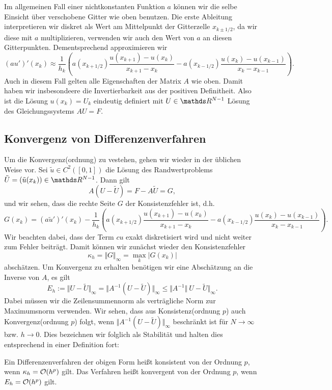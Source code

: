 Im allgemeinen Fall einer nichtkonstanten Funktion $a$ k\"onnen wir die selbe Einsicht \"uber verschobene Gitter wie oben benutzen. Die erste Ableitung interpretieren wir diskret als Wert am Mittelpunkt der Gitterzelle $x_{k\pm1/2}$, da wir diese mit $a$ multiplizieren, verwenden wir auch den Wert von $a$ an diesen Gitterpunkten. Dementsprechend approximieren wir
$$ (a u')'(x_k) \approx \frac{1}{h_k} \left( a(x_{k+1/2}) \frac{u(x_{k+1}) -  u(x_k)}{x_{k+1}-x_k} - a(x_{k-1/2}) \frac{u(x_k)- u(x_{k-1})}{x_k - x_{k-1}} \right). $$
Auch in diesem Fall gelten alle Eigenschaften der Matrix $A$ wie oben. Damit haben wir insbesondeere die Invertierbarkeit aus der positiven Definitheit. Also ist die L\"osung $u(x_k) =U_k$ eindeutig definiert mit $U \in \R^{N-1}$ L\"osung des Gleichungssystems $AU=F$.

\subsection{Konvergenz von Differenzenverfahren} 

Um die Konvergenz(ordnung) zu vestehen, gehen wir wieder in der \"ublichen Weise vor. Sei $\tilde u \in C^2([0,1])$ die L\"osung des Randwertproblems $\tilde U = (\tilde u(x_k)) \in \R^{N-1}$. Dann gilt 
$$ A (U - \tilde U) = F - A \tilde U = G, $$
und wir sehen, dass die rechte Seite $G$ der Konsistenzfehler ist, d.h.
$$ G(x_k) = (a \tilde u')'(x_k) - \frac{1}{h_k} \left( a(x_{k+1/2}) \frac{u(x_{k+1}) -  u(x_k)}{x_{k+1}-x_k} - a(x_{k-1/2}) \frac{u(x_k)- u(x_{k-1})}{x_k - x_{k-1}} \right). $$
Wir beachten dabei, dass der Term $cu$ exakt diskretisiert wird und nicht weiter zum Fehler beitr\"agt. Damit k\"onnen wir zun\"achst wieder den Konsistenzfehler 
\begin{equation}
\kappa_h = \Vert G\Vert_\infty =  \max_{k} \vert G(x_k) \vert
\end{equation}
absch\"atzen. Um Konvergenz zu erhalten ben\"otigen wir eine Absch\"atzung an  die Inverse von $A$, es gilt
$$ E_h := \Vert U - \tilde U\Vert_\infty = \Vert A^{-1} (U - \tilde U) \Vert_\infty \leq \Vert A^{-1}  \Vert ~ U - \tilde U \Vert_\infty. $$
Dabei m\"ussen wir die Zeilensummennorm als vertr\"agliche Norm zur Maximumsnorm verwenden. Wir sehen, dass aus Konsistenz(ordnung $p$) auch Konvergenz(ordnung $p$) folgt, wenn $\Vert A^{-1} (U - \tilde U) \Vert_\infty$ beschr\"ankt ist f\"ur $N\rightarrow \infty$ bzw. $h \rightarrow 0$. Dies bezeichnen wir folglich als Stabilit\"at und halten dies entsprechend in einer Definition fort:
\begin{definition}{}{}
Ein Differenzenverfahren der obigen Form hei{\ss}t konsistent von der Ordnung $p$, wenn $\kappa_h = {\cal O}(h^p)$ gilt. Das Verfahren hei{\ss}t konvergent von der Ordnung $p$, wenn $E_h  = {\cal O}(h^p)$ gilt.
\end{definition} 

